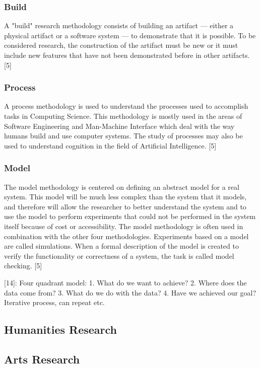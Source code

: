 \subsubsection*{Build}

A "build" research methodology consists of building an artifact — either a physical artifact or a software system — to demonstrate that it is possible. To be considered research, the construction of the artifact must be new or it must include new features that have not been demonstrated before in other artifacts. [5]

\subsubsection*{Process}

A process methodology is used to understand the processes used to accomplish tasks in Computing Science. This methodology is mostly used in the areas of Software Engineering and Man-Machine Interface which deal with the way humans build and use computer systems. The study of processes may also be used to understand cognition in the field of Artificial Intelligence. [5]

\subsubsection*{Model}

The model methodology is centered on defining an abstract model for a real system. This model will be much less complex than the system that it models, and therefore will allow the researcher to better understand the system and to use the model to perform experiments that could not be performed in the system itself because of cost or accessibility. The model methodology is often used in combination with the other four methodologies. Experiments based on a model are called simulations. When a formal description of the model is created to verify the functionality or correctness of a system, the task is called model checking. [5]

[14]:
Four quadrant model:
1.	What do we want to achieve?
2.	Where does the data come from?
3.	What do we do with the data?
4.	Have we achieved our goal?
Iterative process, can repeat etc.


\subsection{Humanities Research}

\subsection{Arts Research}

